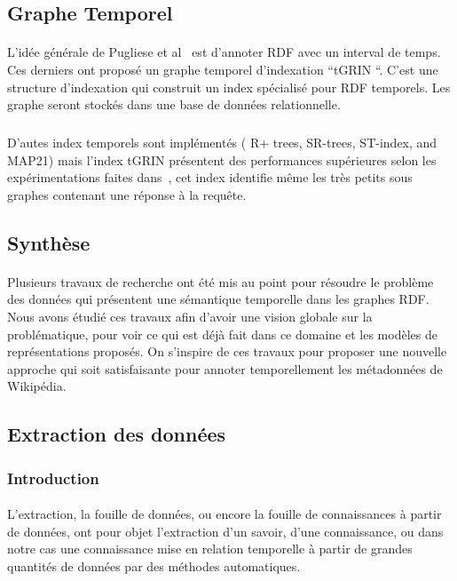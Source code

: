 \documentclass[12pt,a4]{report}
\begin{document}
\subsection{Graphe Temporel}
\paragraph{}
L'idée générale de Pugliese et al~\cite{pugliese2008} est d'annoter RDF avec un interval de temps.
Ces derniers ont proposé un graphe temporel d'indexation ``tGRIN ``. C'est une structure d’indexation qui construit un index spécialisé pour RDF temporels. Les graphe seront stockés dans une base de données relationnelle.
\subparagraph{}
D'autes index temporels sont implémentés ( R+ trees, SR-trees, ST-index, and MAP21) mais l'index tGRIN présentent des performances supérieures selon les expérimentations faites dans~\cite{pugliese2008}, cet index identifie même les très petits sous graphes contenant une réponse à la requête.
\subsection{Synthèse}
\paragraph{}
Plusieurs travaux de recherche ont été mis au point pour résoudre le problème des données qui présentent une sémantique temporelle dans les graphes RDF. Nous avons étudié ces travaux afin d'avoir une vision globale sur la problématique, pour voir ce qui est déjà fait dans ce domaine et les modèles de représentations proposés. On s'inspire de ces travaux pour proposer une nouvelle approche qui soit satisfaisante pour annoter temporellement les métadonnées de Wikipédia.
\subsection{Extraction des données}
\subsubsection{Introduction}
\paragraph{}
L'extraction, la fouille de données, ou encore la fouille de connaissances à partir de données, ont pour objet l'extraction d'un savoir, d'une connaissance, ou dans notre cas une connaissance mise en relation temporelle à partir de grandes quantités de données par des méthodes automatiques.
\end{document}
